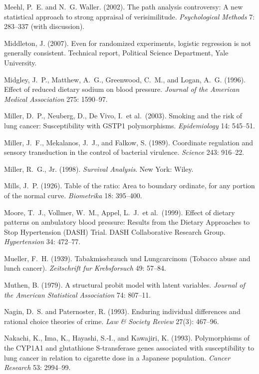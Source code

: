 \smallskip\noindent
Meehl, P.~E. and N.~G. Waller. (2002).
The path analysis controversy: A new statistical approach to strong appraisal of verisimilitude.
{\it Psychological Methods\/} 7: 283--337 (with discussion).

\smallskip\noindent
Middleton, J. (2007).
Even for randomized experiments, logistic regression is not generally consistent.
Technical report, Political Science Department, Yale University.

\smallskip\noindent
Midgley, J.~P., Matthew, A.~G., Greenwood, C.~M., and Logan, A.~G. (1996).
Effect of reduced dietary sodium on blood pressure.
{\it Journal of the American Medical Association\/} 275: 1590--97.

\smallskip\noindent
Miller, D.~P., Neuberg, D., De Vivo, I.~et al.~(2003).
Smoking and the risk of lung cancer:
Susceptibility with GSTP1 polymorphisms.
{\it Epidemiology\/} 14: 545--51.

\smallskip\noindent
Miller, J.~F., Mekalanos, J.~J., and Falkow, S. (1989).
Coordinate regulation and sensory transduction in the control of bacterial virulence.
{\it Science\/} 243: 916--22.

\smallskip\noindent
Miller, R.~G., Jr. (1998).
{\it Survival Analysis\/}.
New York: Wiley.

\smallskip\noindent
Mills, J.~P. (1926).
Table of the ratio: Area to boundary ordinate, for any portion of the normal curve.
{\it Biometrika\/} 18: 395--400.

\smallskip\noindent
Moore, T.~J., Vollmer, W.~M., Appel, L.~J.~et al.~(1999).
Effect of dietary patterns on ambulatory blood pressure:
Results from the Dietary Approaches to Stop Hypertension (DASH) Trial.
DASH Collaborative Research Group.
{\it Hypertension\/} 34: 472--77.

\smallskip\noindent
Mueller, F.~H. (1939).
Tabakmissbrauch und Lungcarcinom (Tobacco abuse and lunch cancer).
{\it Zeitschrift fur Krebsforsuch\/} 49: 57--84.

\smallskip\noindent
Muthen, B. (1979).
A structural probit model with latent variables.
{\it Journal of the American Statistical Association\/} 74: 807--11.

\smallskip\noindent
Nagin, D.~S. and Paternoster, R. (1993).
Enduring individual differences and rational choice theories of crime.
{\it Law \& Society Review\/} 27(3): 467--96.

\smallskip\noindent
Nakachi, K., Ima, K., Hayashi, S.-I., and Kawajiri, K. (1993).
Polymorphisms of the CYP1A1 and glutathione S-transferase genes associated with susceptibility
to lung cancer in relation to cigarette dose in a Japanese population.
{\it Cancer Research} 53: 2994--99.

